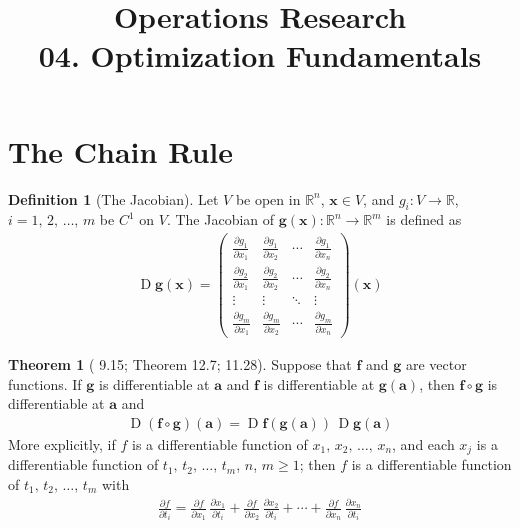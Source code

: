 \documentclass[10pt]{extarticle}
\DeclareMathOperator*{\jac}{D}
\theoremstyle{definition}
\newtheorem*{dfn}{Definition}
\newtheorem*{thm}{Theorem}
\newcommand{\va}{\mathbf{a}}
\newcommand{\vx}{\mathbf{x}}
\newcommand{\vf}{\mathbf{f}}
\newcommand{\vg}{\mathbf{g}}
\newcommand{\pdiff}[2]{\frac{\partial #1}{\partial #2}}
\begin{document}
\title{\texorpdfstring{\vspace{15mm} Operations Research\\ 04. Optimization Fundamentals}{Operations Research\\ 04. Optimization Fundamentals}} 
\author{}
\date{}
\maketitle
\newpage

\section*{The Chain Rule}
\begin{dfn}[The Jacobian]
  Let $V$ be open in $\mathbb{R}^n$, $\vx\in V$, and $g_i:V\to\mathbb{R}$, $i = 1,\,2,\,\ldots,\,m$ be $C^1$ on $V$. The Jacobian of $\vg(\vx): \mathbb{R}^n\to\mathbb{R}^m$ is defined as
  \begin{align*}
    \jac\vg(\vx) = %
    \begin{pmatrix}
      \frac{\partial g_1}{\partial x_1} & \frac{\partial g_1}{\partial x_2} & \cdots & \frac{\partial g_1}{\partial x_{\!n}} \\
      \frac{\partial g_2}{\partial x_1} & \frac{\partial g_2}{\partial x_2} & \cdots & \frac{\partial g_2}{\partial x_{\!n}} \\
      \vdots & \vdots & \ddots &\vdots \\
      \frac{\partial g_m}{\partial x_1} & \frac{\partial g_m}{\partial x_2} & \cdots & \frac{\partial g_m}{\partial x_{\!n}}
    \end{pmatrix}(\vx)
  \end{align*}
\end{dfn}
\begin{thm}[\citet{rudin} 9.15; \citet{apostol_adv} Theorem 12.7; \citet{wade} 11.28]
  Suppose that $\vf$ and $\vg$ are vector functions. If $\vg$ is differentiable at $\va$ and $\vf$ is differentiable at $\vg(\va)$, then $\vf\circ\vg$ is differentiable at $\va$ and
  \begin{align*}
    \jac(\vf\circ\vg)(\va) = \jac\vf(\vg(\va))\,\jac\vg(\va)
  \end{align*}
  More explicitly, if $f$ is a differentiable function of $x_1,\,x_2,\,\ldots,\,x_n$, and each $x_j$ is a differentiable function of $t_1,\,t_2,\,\ldots,\,t_m$, $n$, $m\geqslant 1$; then $f$ is a differentiable function of $t_1,\,t_2,\,\ldots,\,t_m$ with
  \begin{align*}
    \pdiff{f}{t_i} = \pdiff{f}{x_1}\,\pdiff{x_1}{t_i} + \pdiff{f}{x_2}\,\pdiff{x_2}{t_i} + \cdots + \pdiff{f}{x_n}\,\pdiff{x_n}{t_i}
  \end{align*}
\end{thm}
\end{document}
